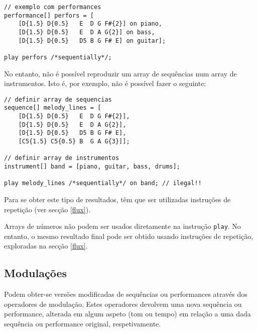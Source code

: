 \documentclass{article}
\begin{document}
\begin{lstlisting} 
// exemplo com performances
performance[] perfors = [
    [D{1.5} D{0.5}   E  D G F#{2}] on piano, 
    [D{1.5} D{0.5}   E  D A G{2}] on bass,
    [D{1.5} D{0.5}   D5 B G F# E] on guitar];
    
play perfors /*sequentially*/;
\end{lstlisting}
No entanto, não é possível reproduzir um array de sequências num array de instrumentos. Isto é, por exemplo, não é possível fazer o seguinte:

\begin{lstlisting} 
// definir array de sequencias
sequence[] melody_lines = [
    [D{1.5} D{0.5}   E  D G F#{2}], 
    [D{1.5} D{0.5}   E  D A G{2}],
    [D{1.5} D{0.5}   D5 B G F# E],
    [C5{1.5} C5{0.5} B  G A G{3}]];

// definir array de instrumentos
instrument[] band = [piano, guitar, bass, drums];

play melody_lines /*sequentially*/ on band; // ilegal!!
\end{lstlisting}

Para se obter este tipo de resultados, têm que ser utilizadas instruções de repetição (ver secção \ref{flux}).


Arrays de números não podem ser usados diretamente na instrução \texttt{play}. No entanto, o mesmo resultado final pode ser obtido usando instruções de repetição, exploradas na secção \ref{flux}.

\subsection{Modulações}
Podem obter-se versões modificadas de sequências ou performances através dos operadores de modulação. Estes operadores devolvem uma nova sequência ou performance, alterada em algum aspeto (tom ou tempo) em relação a uma dada sequência  ou performance original, respetivamente.
\end{document}
